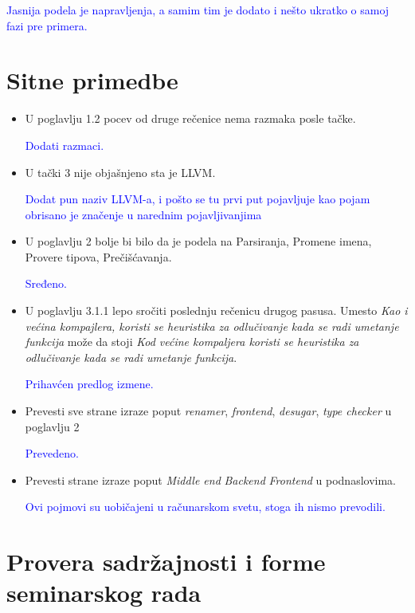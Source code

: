 \documentclass[a4paper]{report}
\newcommand{\odgovor}[1]{\textcolor{blue}{#1}}
\begin{document}
	\odgovor{Jasnija podela je napravljenja, a samim tim je dodato i nešto ukratko o samoj fazi pre primera.}
	
	
	\section{Sitne primedbe}
	\begin{itemize}
		\item U poglavlju 1.2 pocev od druge rečenice nema razmaka posle tačke.
		
		\odgovor{Dodati razmaci.}
		
		\item U tački 3 nije objašnjeno sta je LLVM.
		
		\odgovor{Dodat pun naziv LLVM-a, i pošto se tu prvi put pojavljuje kao pojam obrisano je značenje u narednim pojavljivanjima}
		
		\item U poglavlju 2 bolje bi bilo da je podela na  Parsiranja, Promene imena, Provere tipova, Prečišćavanja.
		
		\odgovor{Sređeno.}
		
		\item U poglavlju 3.1.1 lepo sročiti poslednju rečenicu drugog pasusa. Umesto \emph{Kao i većina kompajlera, koristi se heuristika za odlučivanje kada se radi umetanje funkcija} može da stoji \emph{Kod većine kompaljera koristi se heuristika za odlučivanje kada se radi umetanje funkcija}.
		
		\odgovor{Prihavćen predlog izmene.}
		
		\item Prevesti sve strane izraze poput \emph{renamer}, \emph{frontend}, \emph{desugar}, \emph{type checker} u poglavlju 2
		
		\odgovor{Prevedeno.}
		
		\item Prevesti strane izraze poput \emph{Middle end} \emph{Backend} \emph{Frontend} u podnaslovima.
		
		\odgovor{Ovi pojmovi su uobičajeni u računarskom svetu, stoga ih nismo prevodili.}
		
	\end{itemize}
	\section{Provera sadržajnosti i forme seminarskog rada}
	
\end{document}
